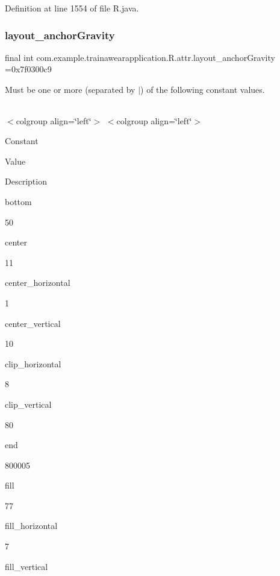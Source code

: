 Definition at line 1554 of file R.\+java.

\mbox{\label{classcom_1_1example_1_1trainawearapplication_1_1_r_1_1attr_aff49a8f88c1b16bf8a08952306119171}} 
\subsubsection{\texorpdfstring{layout\_anchorGravity}{layout\_anchorGravity}}
{\footnotesize\ttfamily final int com.\+example.\+trainawearapplication.\+R.\+attr.\+layout\+\_\+anchor\+Gravity =0x7f0300c9\hspace{0.3cm}{\ttfamily [static]}}

Must be one or more (separated by \textquotesingle{}$\vert$\textquotesingle{}) of the following constant values.

\tabulinesep=1mm
\begin{longtabu}spread 0pt [c]{*{0}{|X[-1]}|}
\hline
\end{longtabu}
$<$colgroup align=\char`\"{}left\char`\"{}$>$ $<$colgroup align=\char`\"{}left\char`\"{}$>$ 

Constant

Value

Description 

bottom

50

center

11

center\+\_\+horizontal

1

center\+\_\+vertical

10

clip\+\_\+horizontal

8

clip\+\_\+vertical

80

end

800005

fill

77

fill\+\_\+horizontal

7

fill\+\_\+vertical

